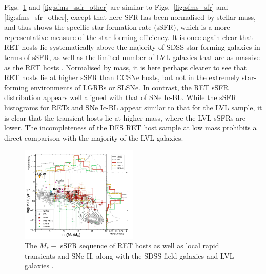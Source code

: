 \documentclass[fleqn,usenatbib,]{mnras}
\newcommand{\replyref}[1]{\color{magenta}#1 \color{black}}
\begin{document}
Figs.~\ref{fig:sfms_ssfr} and \ref{fig:sfms_ssfr_other} are similar to Figs.~\ref{fig:sfms_sfr} and \ref{fig:sfms_sfr_other}, except that here SFR has been normalised by stellar mass, and thus shows the specific star-formation rate (sSFR), which is a more representative measure of the star-forming efficiency. It is once again clear that RET hosts lie systematically above the majority of SDSS star-forming galaxies in terms of sSFR, \replyref{as well as the limited number of LVL galaxies that are as massive as the RET hosts}. Normalised by mass, it is here perhaps clearer to see that RET hosts lie at higher sSFR than CCSNe hosts, but not in the extremely star-forming environments of LGRBs or SLSNe. \replyref{In contrast, the RET sSFR distribution appears well aligned with that of SNe Ic-BL. While the sSFR histograms for RETs and SNe Ic-BL appear similar to that for the LVL sample, it is clear that the transient hosts lie at higher mass, where the LVL sSFRs are lower. The incompleteness of the DES RET host sample at low mass prohibits a direct comparison with the majority of the LVL galaxies.}



\begin{figure}
\includegraphics[width=0.5\textwidth]{figs/sSFR_Mike_RETs.png}
\caption{The $M_* -$ sSFR sequence of RET hosts as well as local rapid transients and SNe II, along with the SDSS field galaxies \replyref{and LVL galaxies}.
\label{fig:sfms_ssfr}}
\end{figure}
\end{document}
